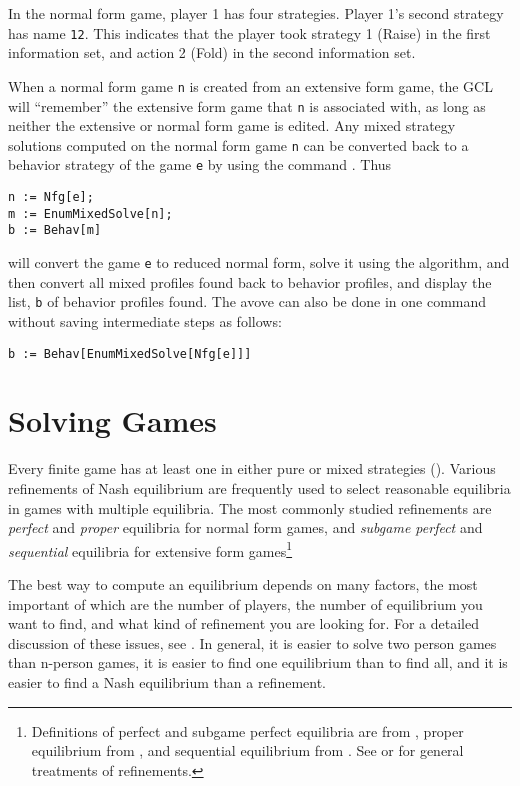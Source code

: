 In the normal form game, player 1 has four strategies.  Player 1's
second strategy has name \verb+12+.  This indicates that the player
took strategy 1 (Raise) in the first information set, and action 2
(Fold) in the second information set.  

When a normal form game \verb+n+ is created from an extensive form
game, the GCL will ``remember'' the extensive form game that \verb+n+
is associated with, as long as neither the extensive or normal form
game is edited.  Any mixed strategy solutions computed on the normal
form game \verb+n+ can be converted back to a behavior strategy of the
game \verb+e+ by using the command .  Thus

\begin{verbatim}
n := Nfg[e];
m := EnumMixedSolve[n];
b := Behav[m]
\end{verbatim}

\noindent
will convert the game \verb+e+ to reduced normal form, solve it using
the  algorithm, and then convert all mixed profiles found back
to behavior profiles, and display the list, \verb+b+ of behavior
profiles found. The avove can also be done in one command without saving
intermediate steps as follows:  
  
\begin{verbatim}
b := Behav[EnumMixedSolve[Nfg[e]]]
\end{verbatim}

\chapter{Solving Games}

Every finite game has at least one  in either pure or mixed
strategies (\cite{Nash:1950}).  Various refinements of Nash
equilibrium are frequently used to select reasonable equilibria in
games with multiple equilibria.  The most commonly studied refinements
are {\em perfect} and {\em proper} equilibria for normal form games,
and {\em subgame perfect} and {\em sequential} equilibria for
extensive form games\footnote{Definitions of perfect and subgame perfect
equilibria are from \cite{Selten:1975}, proper equilibrium from
\cite{Myerson}, and sequential equilibrium from
\cite{KrepsWilson:1982}.  See \cite{vanDamme:1987} or \cite{Mye:91}
for general treatments of refinements.}

The best way to compute an equilibrium depends on many factors, the
most important of which are the number of players, the number of
equilibrium you want to find, and what kind of refinement you are
looking for.  For a detailed discussion of these issues, see
\cite{McKMcL:1996}.  In general, it is easier to solve two person
games than n-person games, it is easier to find one equilibrium than
to find all, and it is easier to find a Nash equilibrium than a
refinement.

